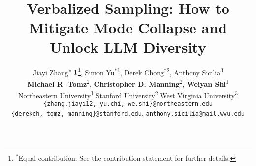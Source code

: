 \documentclass{article} %
\title{Verbalized Sampling: How to Mitigate Mode Collapse and Unlock LLM Diversity}
\author{Jiayi Zhang$^{*}\textsuperscript{1}$\thanks{$^{*}$Equal contribution. See the contribution statement for further details.}, Simon Yu$^{*}$\textsuperscript{1}, Derek Chong$^{*}$\textsuperscript{2}, Anthony Sicilia\textsuperscript{3}\\ \textbf{Michael R. Tomz}\textsuperscript{2}, \textbf{Christopher D. Manning}\textsuperscript{2}, \textbf{Weiyan Shi}\textsuperscript{1} \\
Northeastern University\textsuperscript{1} \quad Stanford University\textsuperscript{2} \quad West Virginia University\textsuperscript{3}  \\
\texttt{\small\{zhang.jiayi12, yu.chi, we.shi\}@northeastern.edu} \\
\texttt{\small\{derekch, tomz, manning\}@stanford.edu}, \texttt{\small anthony.sicilia@mail.wvu.edu}
}
\theoremstyle{definition}
\theoremstyle{remark}
\theoremstyle{assumption}
\theoremstyle{lemma}
\begin{document}
\maketitle

\begin{abstract}

\end{abstract}


% 













\end{document}
